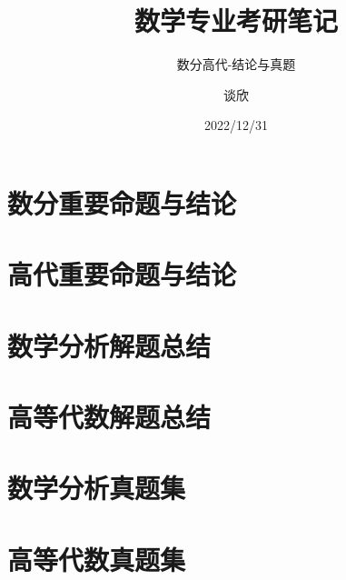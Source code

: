 \documentclass[lang=cn,newtx,12pt,scheme=chinese]{elegantbook}
\title{数学专业考研笔记}
\subtitle{数分高代-结论与真题}
\author{谈欣}
\institute{湖北第二师范学院数学与统计学院}
\date{2022/12/31}
\begin{document}
	
	\maketitle\frontmatter\tableofcontents\mainmatter
	
	\chapter{数分重要命题与结论}\newpage
	
	
	\newpage
	
	
	
	\newpage
	
	\newpage
	\newpage
	\newpage
	
	\newpage
	\newpage
	\newpage
	
	\newpage
	\newpage
	
	\newpage
	\newpage
	\newpage
	
	\newpage
	\newpage
	
	\newpage
	\newpage
	\newpage
	
	\chapter{高代重要命题与结论}
	
	\chapter{数学分析解题总结}
	
	\chapter{高等代数解题总结}
	
	\chapter{数学分析真题集}
	
	\chapter{高等代数真题集}
\end{document}
